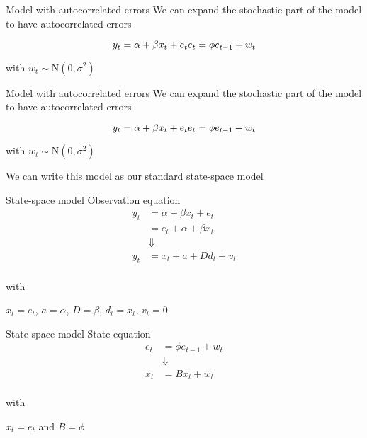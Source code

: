 \documentclass[
  ignorenonframetext,
]{beamer}
\begin{document}
\begin{frame}{Model with autocorrelated errors}
\protect\hypertarget{model-with-autocorrelated-errors}{}
We can expand the stochastic part of the model to have autocorrelated
errors

\[
y_t = \alpha + \beta x_t + e_t \\
e_t = \phi e_{t-1} + w_t
\]

with \(w_t \sim \text{N}(0,\sigma^2)\)
\end{frame}

\begin{frame}{Model with autocorrelated errors}
\protect\hypertarget{model-with-autocorrelated-errors-1}{}
We can expand the stochastic part of the model to have autocorrelated
errors

\[
y_t = \alpha + \beta x_t + e_t \\
e_t = \phi e_{t-1} + w_t
\]

with \(w_t \sim \text{N}(0,\sigma^2)\)

We can write this model as our standard state-space model
\end{frame}

\begin{frame}{State-space model \textbar{} Observation equation}
\protect\hypertarget{state-space-model-observation-equation}{}
\[
\begin{align}
  y_t &= \alpha + \beta x_t + e_t \\
      &= e_t + \alpha + \beta x_t\\
      &\Downarrow \\
  y_t &= x_t + a + D d_t + v_t\\
\end{align}
\]

with

\(x_t = e_t\), \(a = \alpha\), \(D = \beta\), \(d_t = x_t\), \(v_t = 0\)
\end{frame}

\begin{frame}{State-space model \textbar{} State equation}
\protect\hypertarget{state-space-model-state-equation}{}
\[
\begin{align}
  e_t &= \phi e_{t-1} + w_t \\
      &\Downarrow \\
  x_t &= B x_t + w_t\\
\end{align}
\]

with

\(x_t = e_t\) and \(B = \phi\)
\end{frame}
\end{document}

